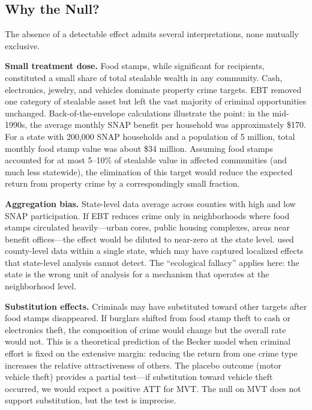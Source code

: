 \documentclass[12pt]{article}
\begin{document}
\subsection{Why the Null?}

The absence of a detectable effect admits several interpretations, none mutually exclusive.

\textbf{Small treatment dose.} Food stamps, while significant for recipients, constituted a small share of total stealable wealth in any community. Cash, electronics, jewelry, and vehicles dominate property crime targets. EBT removed one category of stealable asset but left the vast majority of criminal opportunities unchanged. Back-of-the-envelope calculations illustrate the point: in the mid-1990s, the average monthly SNAP benefit per household was approximately \$170. For a state with 200,000 SNAP households and a population of 5 million, total monthly food stamp value was about \$34 million. Assuming food stamps accounted for at most 5--10\% of stealable value in affected communities (and much less statewide), the elimination of this target would reduce the expected return from property crime by a correspondingly small fraction.

\textbf{Aggregation bias.} State-level data average across counties with high and low SNAP participation. If EBT reduces crime only in neighborhoods where food stamps circulated heavily---urban cores, public housing complexes, areas near benefit offices---the effect would be diluted to near-zero at the state level. \citet{wright2017less} used county-level data within a single state, which may have captured localized effects that state-level analysis cannot detect. The ``ecological fallacy'' applies here: the state is the wrong unit of analysis for a mechanism that operates at the neighborhood level.

\textbf{Substitution effects.} Criminals may have substituted toward other targets after food stamps disappeared. If burglars shifted from food stamp theft to cash or electronics theft, the composition of crime would change but the overall rate would not. This is a theoretical prediction of the Becker model when criminal effort is fixed on the extensive margin: reducing the return from one crime type increases the relative attractiveness of others. The placebo outcome (motor vehicle theft) provides a partial test---if substitution toward vehicle theft occurred, we would expect a positive ATT for MVT. The null on MVT does not support substitution, but the test is imprecise.
\end{document}
